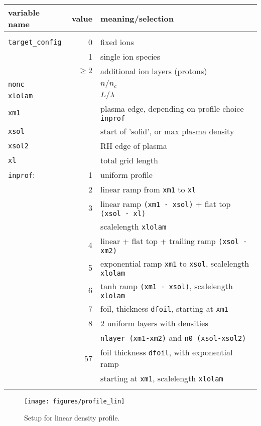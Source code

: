 \documentclass[11pt]{article}
\begin{document}
\begin{tabular}{lrl}
variable name & value & meaning/selection \\ 
\hline \\
\texttt{target\_config} & 0 & fixed ions \\
& 1 & single ion species \\
& $\geq 2$ & additional ion layers (protons) \\
\texttt{nonc} && $n/n_c$   \\ 
\texttt{xlolam} && $L/\lambda$   \\
\texttt{xm1} &&plasma edge, depending on profile choice \texttt{inprof}\\ 
\texttt{xsol} &&start of 'solid', or max plasma density\\ 
\texttt{xsol2} && RH edge of plasma\\ 
\texttt{xl}&& total grid length \\

\texttt{inprof}: & 1 & uniform profile\\
		&    2 & linear ramp from \texttt{xm1} to \texttt{xl} \\ 
& 3 & linear ramp \texttt{(xm1 - xsol)} + flat top \texttt{(xsol - xl)}\\ 
&   & scalelength \texttt{xlolam} \\ 
& 4 & linear + flat top + trailing ramp \texttt{(xsol - xm2)}\\ 
& 5 & exponential ramp \texttt{xm1} to \texttt{xsol}, scalelength \texttt{xlolam}\\
& 6 & tanh ramp \texttt{(xm1 - xsol)}, scalelength \texttt{xlolam}\\ 
& 7 & foil, thickness \texttt{dfoil}, starting at \texttt{xm1} \\ 
& 8 & 2 uniform layers with densities \\
&& \texttt{nlayer (xm1-xm2)} and  \texttt{n0 (xsol-xsol2)}\\ 
& 57 & foil thickness \texttt{dfoil}, with exponential ramp \\
&& starting at \texttt{xm1}, scalelength \texttt{xlolam} \\\hline \\
\end{tabular} 

\begin{figure}[htb]
\begin{center}
\texttt{[image: figures/profile\_lin]}
\caption{Setup for linear density profile.}
\end{center}
\label{linear_profile}
\end{figure}
\end{document}
